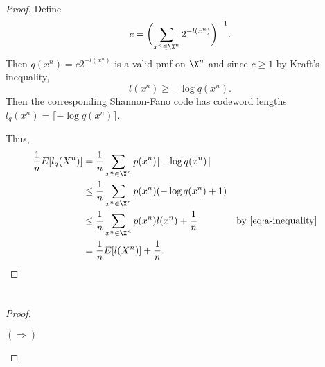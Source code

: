 \documentclass[
  coursecode={MTHE 477},
  assignmentname={Homework \homeworknumber},
  studentnumber=20053722,
  name={Bryan Hoang},
  draft,
]{
  ltxanswer%
}
\begin{document}
  \begin{questions}
    \setcounter{question}{\questionnumber}
    \addtocounter{question}{-1}
    \question[20]\
    \begin{parts}
      \part{}
      \begin{solution}
        \begin{proof}
          Define
          \begin{equation*}
            c = \biggl(\sum_{x^{n}\in\X^{n}} 2^{-l(x^{n})}\biggr)^{-1}.
          \end{equation*}
          Then \(q(x^{n}) = c2^{-l(x^{n})}\) is a valid pmf on \(\X^{n}\) and since \(c \ge 1\) by Kraft's inequality,
          \begin{equation}\label{eq:a-inequality}
            l(x^{n}) \ge -\log q(x^{n}).
          \end{equation}
          Then the corresponding Shannon-Fano code has codeword lengths \(l_{q}(x^{n}) = \lceil -\log q(x^{n}) \rceil\).

          Thus,
          \begin{align*}
            \frac{1}{n} E[l_{q}(X^{n})] &= \frac{1}{n} \sum_{x^{n}\in\X^{n}} p(x^{n}) \lceil -\log q(x^{n}) \rceil                                      \\
                                        &\le \frac{1}{n} \sum_{x^{n}\in\X^{n}} p(x^{n}) (-\log q(x^{n}) + 1)                                            \\
                                        &\le \frac{1}{n} \sum_{x^{n}\in\X^{n}} p(x^{n}) l(x^{n}) + \frac{1}{n}     & &\text{by~\eqref{eq:a-inequality}} \\
                                        &= \frac{1}{n} E[l(X^{n})] + \frac{1}{n}.
          \end{align*}
        \end{proof}
      \end{solution}

      \part{}
      \begin{solution}
        \begin{proof}
          \begin{proofpart}
            \((\Rightarrow)\)


\end{proofpart}
\end{proof}
\end{solution}
\end{parts}
\end{questions}
\end{document}
